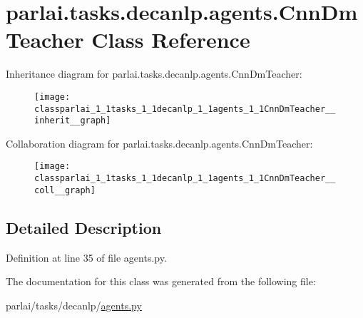 \hypertarget{classparlai_1_1tasks_1_1decanlp_1_1agents_1_1CnnDmTeacher}{}\section{parlai.\+tasks.\+decanlp.\+agents.\+Cnn\+Dm\+Teacher Class Reference}
\label{classparlai_1_1tasks_1_1decanlp_1_1agents_1_1CnnDmTeacher}


Inheritance diagram for parlai.\+tasks.\+decanlp.\+agents.\+Cnn\+Dm\+Teacher\+:
\nopagebreak
\begin{figure}[H]
\begin{center}
\leavevmode
\texttt{[image: classparlai\_1\_1tasks\_1\_1decanlp\_1\_1agents\_1\_1CnnDmTeacher\_\_inherit\_\_graph]}
\end{center}
\end{figure}


Collaboration diagram for parlai.\+tasks.\+decanlp.\+agents.\+Cnn\+Dm\+Teacher\+:
\nopagebreak
\begin{figure}[H]
\begin{center}
\leavevmode
\texttt{[image: classparlai\_1\_1tasks\_1\_1decanlp\_1\_1agents\_1\_1CnnDmTeacher\_\_coll\_\_graph]}
\end{center}
\end{figure}


\subsection{Detailed Description}


Definition at line 35 of file agents.\+py.



The documentation for this class was generated from the following file\+:\begin{DoxyCompactItemize}
\item 
parlai/tasks/decanlp/\hyperlink{parlai_2tasks_2decanlp_2agents_8py}{agents.\+py}\end{DoxyCompactItemize}
